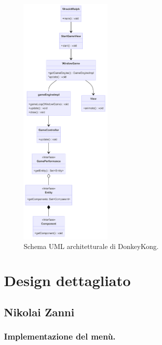 \documentclass[a4paper,12pt]{report}
\begin{document}
\begin{figure}[H]
\centering{}
\includegraphics[width=0.4\textwidth]{img/architettura.png}
\caption{Schema UML architetturale di DonkeyKong.}
\label{img:architettura}
\end{figure}

\section{Design dettagliato}
\subsection{Nikolai Zanni}

\subsubsection{Implementazione del menù.}
\end{document}
